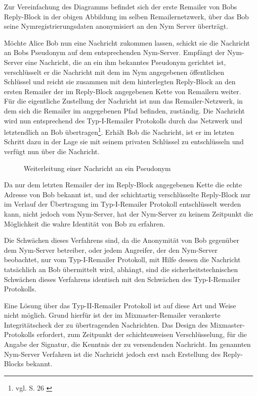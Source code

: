 Zur Vereinfachung des Diagramms befindet sich der erste Remailer von Bobs Reply-Block in der obigen Abbildung im selben Remailernetzwerk, über das Bob seine Nymregistrierungsdaten anonymisiert an den Nym Server überträgt.

Möchte Alice Bob nun eine Nachricht zukommen lassen, schickt sie die Nachricht an Bobs Pseudonym auf dem entsprechenden Nym-Server. Empfängt der Nym-Server eine Nachricht, die an ein ihm bekanntes Pseudonym gerichtet ist, verschlüsselt er die Nachricht mit dem im Nym angegebenen öffentlichen Schlüssel und reicht sie zusammen mit dem hinterlegten Reply-Block an den ersten Remailer der im Reply-Block angegebenen Kette von Remailern weiter. Für die eigentliche Zustellung der Nachricht ist nun das Remailer-Netzwerk, in dem sich die Remailer im angegebenen Pfad befinden, zuständig. Die Nachricht wird nun entsprechend des Typ-I-Remailer Protokolls durch das Netzwerk und letztendlich an Bob übertragen\footnote{vgl. S. 26 \cite{loesing2009privacy}}. Erhält Bob die Nachricht, ist er im letzten Schritt dazu in der Lage sie mit seinem privaten Schlüssel zu entschlüsseln und verfügt nun über die Nachricht. 

\begin{figure}
	\centering
	\begin{sequencediagram}
	\end{sequencediagram}
	\caption{Weiterleitung einer Nachricht an ein Pseudonym}
\end{figure}

Da nur dem letzten Remailer der im Reply-Block angegebenen Kette die echte Adresse von Bob bekannt ist, und der schichtartig verschlüsselte Reply-Block nur im Verlauf der Übertragung im Typ-I-Remailer Protokoll entschlüsselt werden kann, nicht jedoch vom Nym-Server, hat der Nym-Server zu keinem Zeitpunkt die Möglichkeit die wahre Identität von Bob zu erfahren. 

Die Schwächen dieses Verfahrens sind, da die Anonymität von Bob gegenüber dem Nym-Server betreiber, oder jedem Angreifer, der den Nym-Server beobachtet, nur vom Typ-I-Remailer Protokoll, mit Hilfe dessen die Nachricht tatsächlich an Bob übermittelt wird, abhängt, sind die sicherheitstechnischen Schwächen dieses Verfahrens identisch mit den Schwächen des Typ-I-Remailer Protokolls.

Eine Lösung über das Typ-II-Remailer Protokoll ist auf diese Art und Weise nicht möglich. Grund hierfür ist der im Mixmaster-Remailer verankerte Integritätscheck der zu übertragenden Nachrichten. Das Design des Mixmaster-Protokolls erfordert, zum Zeitpunkt der schichtenweisen Verschlüsselung, für die Angabe der Signatur, die Kenntnis der zu versendenden Nachricht. Im genannten Nym-Server Verfahren ist die Nachricht jedoch erst nach Erstellung des Reply-Blocks bekannt.